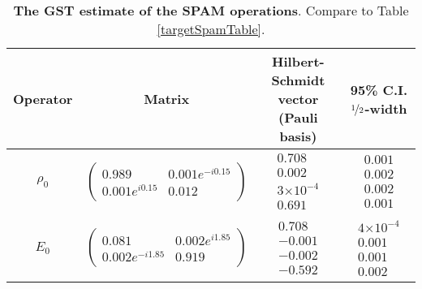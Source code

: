 \documentclass{article}[11pt]
\providecommand{\e}[1]{\ensuremath{\times 10^{#1}}}
\begin{document}
\begin{table}[h]
\begin{center}
\begin{tabular}[l]{|c|c|c|c|}
\hline
Operator & Matrix & Hilbert-Schmidt vector (Pauli basis) & 95\% C.I. $\nicefrac{1}{2}$-width \\ \hline
$\rho_{0}$ & $ \left(\!\!\begin{array}{cc}
0.989 & 0.001e^{-i0.15} \\ 
0.001e^{i0.15} & 0.012
 \end{array}\!\!\right) $
 & $ \begin{array}{c}
0.708 \\ 
0.002 \\ 
3\e{-4} \\ 
0.691
 \end{array} $
 & $ \begin{array}{c}
0.001 \\ 
0.002 \\ 
0.002 \\ 
0.001
 \end{array} $
 \\ \hline
$E_{0}$ & $ \left(\!\!\begin{array}{cc}
0.081 & 0.002e^{i1.85} \\ 
0.002e^{-i1.85} & 0.919
 \end{array}\!\!\right) $
 & $ \begin{array}{c}
0.708 \\ 
-0.001 \\ 
-0.002 \\ 
-0.592
 \end{array} $
 & $ \begin{array}{c}
4\e{-4} \\ 
0.001 \\ 
0.001 \\ 
0.002
 \end{array} $
 \\ \hline
\end{tabular}

\caption{\textbf{The GST estimate of the SPAM operations}.  Compare to Table \ref{targetSpamTable}.\label{bestGatesetSpamTable}}
\end{center}
\end{table}
\end{document}
